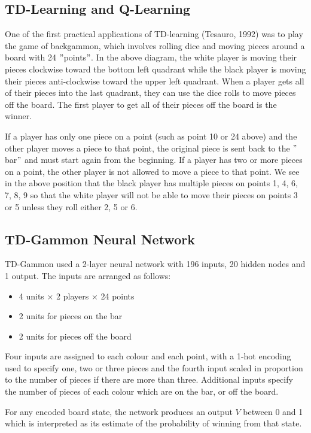 \documentclass[11pt]{article}
\begin{document}
\subsection{TD-Learning and Q-Learning}\label{subsec:td-learning-and-q-learning2}
One of the first practical applications of TD-learning (Tesauro, 1992) was to
play the game of backgammon, which involves rolling dice and moving pieces
around a board with 24 \("\)points\("\).
In the above diagram, the white player is moving their pieces clockwise toward
the bottom left quadrant while the black player is moving their pieces
anti-clockwise toward the upper left quadrant.
When a player gets all of their pieces into the last quadrant, they can use the
dice rolls to move pieces off the board.
The first player to get all of their pieces off the board is the winner.

If a player has only one piece on a point (such as point 10 or 24 above) and
the other player moves a piece to that point, the original piece is sent back
to the \("\)bar\("\) and must start again from the beginning.
If a player has two or more pieces on a point, the other player is not allowed
to move a piece to that point.
We see in the above position that the black player has multiple pieces on
points 1, 4, 6, 7, 8, 9 so that the white player will not be able to move their
pieces on points 3 or 5 unless they roll either 2, 5 or 6.

\subsection{TD-Gammon Neural Network}\label{subsec:td-gammon-neural-network}
TD-Gammon used a 2-layer neural network with 196 inputs, 20 hidden nodes and 1
output.
The inputs are arranged as follows:
\begin{itemize}
  \item 4 units × 2 players × 24 points
  \item 2 units for pieces on the bar
  \item 2 units for pieces off the board
\end{itemize}

Four inputs are assigned to each colour and each point, with a 1-hot encoding
used to specify one, two or three pieces and the fourth input scaled in
proportion to the number of pieces if there are more than three.
Additional inputs specify the number of pieces of each colour which are on the
bar, or off the board.

For any encoded board state, the network produces an output $V$ between 0 and
1 which is interpreted as its estimate of the probability of winning from that
state.
\end{document}

